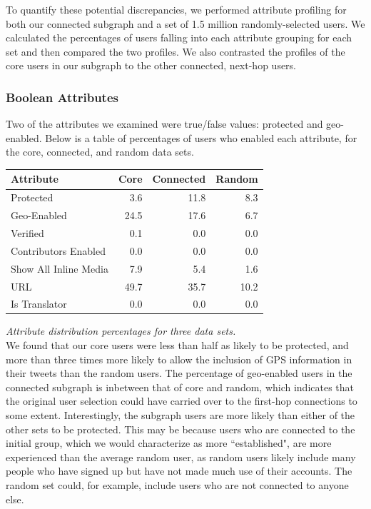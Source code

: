 To quantify these potential discrepancies, we performed attribute profiling for both our connected subgraph and a set of 1.5 million randomly-selected users.  We calculated the percentages of users falling into each attribute grouping for each set and then compared the two profiles.  We also contrasted the profiles of the core users in our subgraph to the other connected, next-hop users.

\subsubsection{Boolean Attributes}

Two of the attributes we examined were true/false values: protected and geo-enabled.  Below is a table of percentages of users who enabled each attribute, for the core, connected, and random data sets.

\begin{center}
\begin{tabular}{| l | r | r | r |}
\hline
\textbf{Attribute} & \textbf{Core} & \textbf{Connected} & \textbf{Random} \\ \hline
Protected & 3.6 & 11.8 & 8.3 \\ \hline
Geo-Enabled & 24.5 & 17.6 & 6.7 \\ \hline
Verified & 0.1 & 0.0 & 0.0 \\ \hline
Contributors Enabled & 0.0 & 0.0 & 0.0 \\ \hline
Show All Inline Media & 7.9 & 5.4 & 1.6 \\ \hline
URL & 49.7 & 35.7 & 10.2 \\ \hline
Is Translator & 0.0 & 0.0 & 0.0 \\ \hline
\end{tabular}
\end{center}
\textit{Attribute distribution percentages for three data sets.}\\

We found that our core users were less than half as likely to be protected, and more than three times more likely to allow the inclusion of GPS information in their tweets than the random users.  The percentage of geo-enabled users in the connected subgraph is inbetween that of core and random, which indicates that the original user selection could have carried over to the first-hop connections to some extent.  Interestingly, the subgraph users are more likely than either of the other sets to be protected.  This may be because users who are connected to the initial group, which we would characterize as more ``established", are more experienced than the average random user, as random users likely include many people who have signed up but have not made much use of their accounts.  The random set could, for example, include users who are not connected to anyone else.

